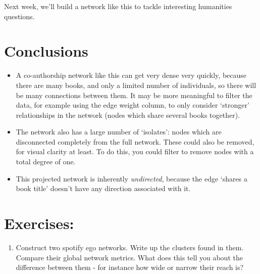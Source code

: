 \documentclass[
]{book}
\providecommand{\tightlist}{%
  \setlength{\itemsep}{0pt}\setlength{\parskip}{0pt}}
\begin{document}
Next week, we'll build a network like this to tackle interesting humanities questions.

\hypertarget{conclusions-4}{%
\section{Conclusions}\label{conclusions-4}}

\begin{itemize}
\item
  A co-authorship network like this can get very dense very quickly, because there are many books, and only a limited number of individuals, so there will be many connections between them. It may be more meaningful to filter the data, for example using the edge weight column, to only consider `stronger' relationships in the network (nodes which share several books together).
\item
  The network also has a large number of `isolates': nodes which are disconnected completely from the full network. These could also be removed, for visual clarity at least. To do this, you could filter to remove nodes with a total degree of one.
\item
  This projected network is inherently \emph{undirected}, because the edge `shares a book title' doesn't have any direction associated with it.
\end{itemize}

\hypertarget{exercises-2}{%
\section{Exercises:}\label{exercises-2}}

\begin{enumerate}
\def\labelenumi{\alph{enumi})}
\tightlist
\item
  Construct two spotify ego networks. Write up the clusters found in them. Compare their global network metrics. What does this tell you about the difference between them - for instance how wide or narrow their reach is?
\end{enumerate}

  
\end{document}
